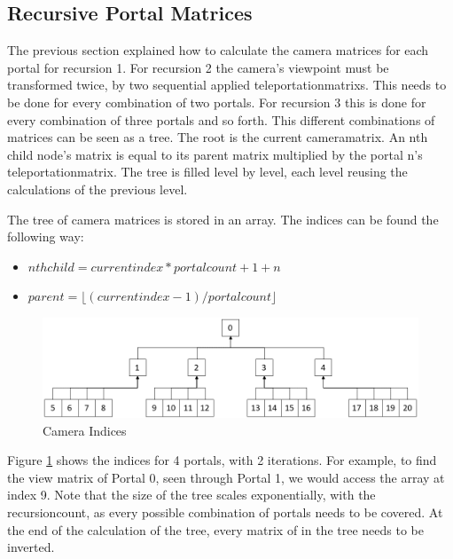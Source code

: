 \subsection{Recursive Portal Matrices}
\label{section:recursivecameramatrices}
The previous section explained how to calculate the camera matrices for each portal for recursion 1. For recursion 2 the camera's viewpoint must be transformed twice, by two sequential applied \glspl{teleportationmatrix}. This needs to be done for every combination of two portals. For recursion 3 this is done for every combination of three portals and so forth. This different combinations of matrices can be seen as a tree. The root is the current \gls{cameramatrix}. An nth child node's matrix is equal to its parent matrix multiplied by the portal n's \gls{teleportationmatrix}. The tree is filled level by level, each level reusing the calculations of the previous level.




The tree of camera matrices is stored in an array. The indices can be found the following way:

\begin{itemize}
	\item $ nth child = current index * portalcount + 1 + n$
	\item $ parent = \lfloor(current index-1)/portal count\rfloor $
\end{itemize}




\begin{figure}[h]
	\includegraphics[width=\linewidth]{images/cameraindices.png}
	\caption{Camera Indices}
	\label{fig:cameraindices}
\end{figure}

Figure \ref{fig:cameraindices} shows the indices for 4 portals, with 2 iterations. For example, to find the view matrix of Portal 0, seen through Portal 1, we would access the array at index 9. Note that the size of the tree scales exponentially, with the \gls{recursioncount}, as every possible combination of portals needs to be covered. At the end of the calculation of the tree, every matrix of in the tree needs to be inverted.


